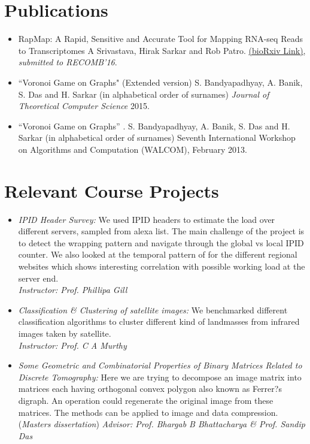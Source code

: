 \documentclass{res}
\begin{document}
\begin{resume}
\section{Publications}
\begin{itemize}
\item{\color{blue}RapMap: A Rapid, Sensitive and Accurate Tool for Mapping RNA-seq Reads to Transcriptomes} A Srivastava, Hirak Sarkar and Rob Patro.  \href{http://dx.doi.org/10.1101/029652}{(bioRxiv Link)}, {\it submitted to RECOMB'16}.
\item {\color{blue}``Voronoi Game on Graphs"} (Extended version) S. Bandyapadhyay, A. Banik, S. Das and H. Sarkar (in alphabetical order of surnames) {\it Journal of Theoretical Computer Science} 2015.
\item {\color{blue}``Voronoi Game on Graphs''} .  S. Bandyapadhyay, A. Banik, S. Das and H. Sarkar (in alphabetical order of surnames) Seventh International Workshop on Algorithms and Computation (WALCOM), February 2013.
\end{itemize}


\section{Relevant Course Projects}
\begin{itemize}
 \item{ \it{IPID Header Survey:}} We used IPID headers to estimate the load over different servers, sampled from alexa
 list. The main challenge of the project is to detect the wrapping pattern and navigate through the global vs local IPID counter. 
 We also looked at the temporal pattern of for the different regional websites which shows interesting correlation with possible 
 working load at the server end. \\
 {\it Instructor: Prof. Phillipa Gill}
 
 \item {{\it Classification \& Clustering of satellite images:}} We benchmarked different classification algorithms to cluster different 
 kind of landmasses from infrared images taken by satellite. \\
 {\it Instructor: Prof. C A Murthy}
  
 \item {{\it Some Geometric and Combinatorial Properties of Binary Matrices Related to
Discrete Tomography:}} Here we are trying to decompose an image matrix into matrices
each having orthogonal convex polygon also known as Ferrer?s digraph. An operation could
regenerate the original image from these matrices. The methods can be applied to image and
data compression. ({\it Masters dissertation}) 
{\it Advisor: Prof. Bhargab B Bhattacharya \& Prof. Sandip Das}


\end{itemize}
\end{resume}
\end{document}

